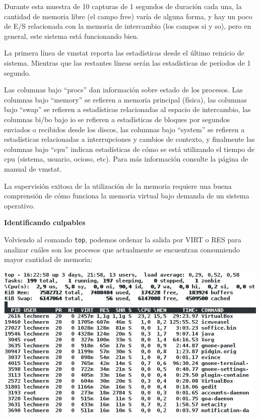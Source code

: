 \documentclass[12pt]{article}
\begin{document}
Durante esta muestra de 10 capturas de 1 segundos de duración cada una, la 
cantidad de memoria libre (el campo free) varía de alguna forma, y hay un poco de E/S relacionada con la memoria de intercambio (los campos si y so), pero en general, este sistema está funcionando bien. 

La primera línea de vmstat reporta las estadísticas desde el último reinicio
de sistema. Mientras que las restantes líneas serán las estadísticas de 
períodos de 1 segundo. 

Las columnas bajo ``procs'' dan información sobre estado de los procesos.
Las columnas bajo ``memory'' se refieren a memoria principal (física), las
columnas bajo ``swap'' se refieren a estadísticas relacionadas al espacio 
de intercambio, las columnas bi/bo bajo io se refieren a estadísticas de 
bloques por segundos enviados o recibidos desde los discos, las columnas
bajo ``system'' se refieren a estadísticas relacionadas a interrupciones y
cambios de contexto, y finalmente las columnas bajo ``cpu'' indican 
estadísticas de cómo se está utilizando el tiempo de cpu (sistema, usuario, 
ocioso, etc). Para más información consulte la página de manual de vmstat. 

La supervisión exitosa de la utilización de la memoria requiere una buena 
comprensión de cómo funciona la memoria virtual bajo demanda de un sistema 
operativo.

{\bf Identificando culpables}

Volviendo al comando \texttt{top}, podemos ordenar la salida por VIRT o RES
para analizar cuáles son los procesos que actualmente se encuentran 
consumiendo mayor cantidad de memoria: 

\begin{center}
 \includegraphics{topmem.png}
\end{center}
\end{document}
